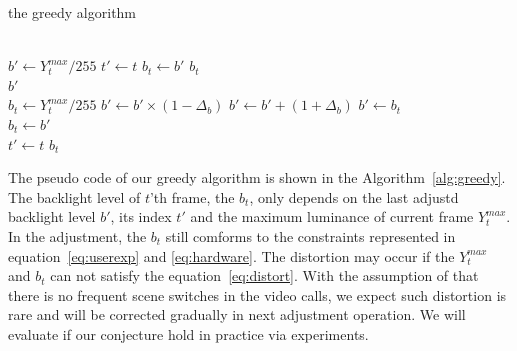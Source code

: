 
\begin{algorithm}
  \caption{the greedy algorithm}
  \label{alg:greedy}
  \begin{algorithmic}[1]
    \\
      \State $b' \gets Y_{t}^{max} / 255$
      \State $t' \gets t$
      \State $b_t \gets b'$
      \Return $b_t$
    \EndIf
      \\
      \Return $b'$
    \EndIf
    \\

    \State $b_{t} \gets Y_{t}^{max} / 255$
      \State $b' \gets b' \times (1 - \Delta_{b})$
      \State $b' \gets b' + (1 + \Delta_{b})$
    \Else
      \State $b' \gets b_t$
    \EndIf
    \\
    \State $b_{t} \gets b'$\\
    \State $t' \gets t$
    \Return $b_{t}$
  \end{algorithmic}
  
\end{algorithm}

The pseudo code of 
our greedy algorithm is shown in the
Algorithm~\ref{alg:greedy}. The backlight level of $t$'th frame, the
$b_t$, only depends on the last adjustd backlight level $b'$, its
index $t'$ and the maximum luminance of current frame $Y_t^{max}$. In
the adjustment, the $b_t$ still comforms to the constraints represented
in equation~\ref{eq:userexp} and \ref{eq:hardware}. The distortion may
occur if the $Y_t^{max}$ and $b_t$ can not satisfy the
equation~\ref{eq:distort}. With the assumption of that there is no
frequent scene switches in the video calls, we expect such distortion
is rare and will be
corrected gradually in next adjustment operation. We will evaluate if
our conjecture hold in practice via experiments. 







